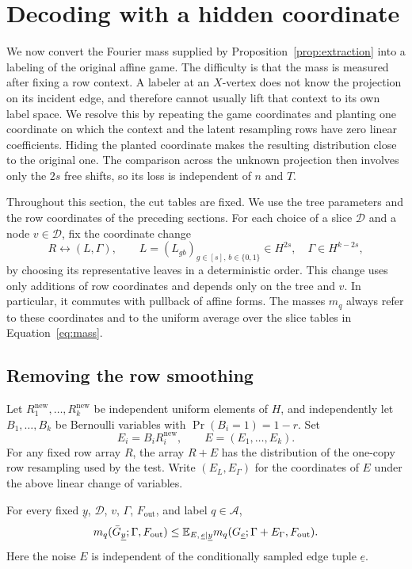 \section{Decoding with a hidden coordinate}
\label{sec:decoding}

We now convert the Fourier mass supplied by Proposition~\ref{prop:extraction}
into a labeling of the original affine game.  The difficulty is that the
mass is measured after fixing a row context.  A labeler at an $X$-vertex
does not know the projection on its incident edge, and therefore cannot
usually lift that context to its own label space.  We resolve this by
repeating the game coordinates and planting one coordinate on which the
context and the latent resampling rows have zero linear coefficients.
Hiding the planted coordinate makes the resulting
distribution close to the original one.
The comparison across the unknown projection then involves only the $2s$
free shifts, so its loss is independent of $n$ and $T$.

Throughout this section, the cut tables are fixed.  We use the tree
parameters and the row coordinates of the preceding sections.  For each
choice of a slice $\mathcal D$ and a node $v\in\mathcal D$, fix the
coordinate change
\[
 R\longleftrightarrow (L,\Gamma),\qquad
 L=(L_{gb})_{g\in[s],\,b\in\{0,1\}}\in H^{2s},
 \quad \Gamma\in H^{k-2s},
\]
by choosing its representative leaves in a deterministic order.  This
change uses only additions of row coordinates and depends only on the
tree and $v$.  In particular, it commutes with pullback of affine forms.
The masses $m_q$ always refer to these coordinates and to the uniform
average over the slice tables in Equation~\eqref{eq:mass}.

\subsection{Removing the row smoothing}

Let $R^{\mathrm{new}}_1,\ldots,R^{\mathrm{new}}_k$ be independent uniform
elements of $H$, and independently let $B_1,\ldots,B_k$ be Bernoulli
variables with $\Pr(B_i=1)=1-r$.  Set
\[
 E_i=B_iR^{\mathrm{new}}_i,
 \qquad E=(E_1,\ldots,E_k).
\]
For any fixed row array $R$, the array $R+E$ has the distribution of
the one-copy row resampling used by the test.  Write $(E_L,E_\Gamma)$
for the coordinates of $E$ under the above linear change of variables.

\begin{lemma}\label{lem:unsmooth}
For every fixed $\underline y$, $\mathcal D$, $v$, $\Gamma$,
$F_{\mathrm{out}}$, and label $q\in\mathcal A$,
\begin{equation}\label{eq:unsmooth}
 m_q(\bar G_{\underline y};\Gamma,F_{\mathrm{out}})
 \leq
 \mathbb E_{E,\,\underline e\mid\underline y}
 m_q(G_{\underline e};\Gamma+E_\Gamma,F_{\mathrm{out}}).
\end{equation}
Here the noise $E$ is independent of the conditionally sampled edge
tuple $\underline e$.
\end{lemma}

